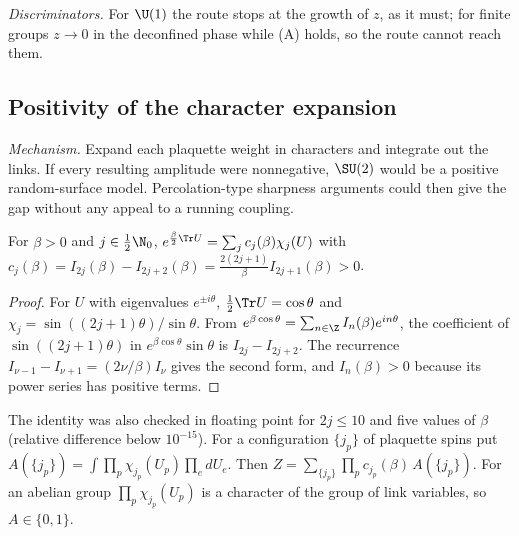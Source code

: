 \emph{Discriminators.} For $\U(1)$ the route stops at the growth of $z$, as it must; for finite
groups $z\to0$ in the deconfined phase while (A) holds, so the route cannot reach them.

\subsection{Positivity of the character expansion}\label{neg:sub-dual}

\emph{Mechanism.} Expand each plaquette weight in characters and integrate out the links. If
every resulting amplitude were nonnegative, $\SU(2)$ would be a positive random-surface model.
Percolation-type sharpness arguments could then give the gap without any appeal to a running
coupling.

\begin{lemma}\label{neg:lem-cj}
For $\beta>0$ and $j\in\frac12\N_0$,
$e^{\frac\beta2\Tr U}=\sum_jc_j(\beta)\chi_j(U)$ with
$c_j(\beta)=I_{2j}(\beta)-I_{2j+2}(\beta)=\frac{2(2j+1)}{\beta}I_{2j+1}(\beta)>0$.
\end{lemma}

\begin{proof}
For $U$ with eigenvalues $e^{\pm i\theta}$, $\frac12\Tr U=\cos\theta$ and
$\chi_j=\sin((2j+1)\theta)/\sin\theta$. From $e^{\beta\cos\theta}=\sum_{n\in\Z}I_n(\beta)e^{in\theta}$,
the coefficient of $\sin((2j+1)\theta)$ in $e^{\beta\cos\theta}\sin\theta$ is $I_{2j}-I_{2j+2}$.
The recurrence $I_{\nu-1}-I_{\nu+1}=(2\nu/\beta)I_\nu$ gives the second form, and $I_n(\beta)>0$
because its power series has positive terms.
\end{proof}

The identity was also checked in floating point for $2j\le10$ and five values of $\beta$
(relative difference below $10^{-15}$). For a configuration $\{j_p\}$ of plaquette spins put
$A(\{j_p\})=\int\prod_p\chi_{j_p}(U_p)\prod_e dU_e$. Then
$Z=\sum_{\{j_p\}}\prod_pc_{j_p}(\beta)\,A(\{j_p\})$. For an abelian group $\prod_p\chi_{j_p}(U_p)$
is a character of the group of link variables, so $A\in\{0,1\}$.


